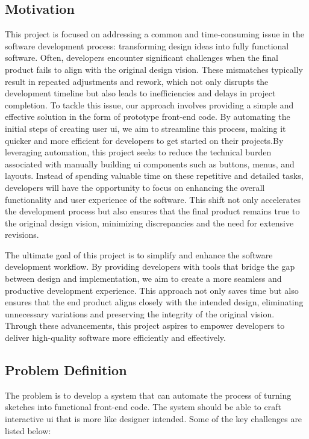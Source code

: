     
    \subsection{Motivation}
    This project is focused on addressing a common and time-consuming issue in the software development process: transforming design ideas into fully functional software. Often, developers encounter significant challenges when the final product fails to align with the original design vision. These mismatches typically result in repeated adjustments and rework, which not only disrupts the development timeline but also leads to inefficiencies and delays in project completion. To tackle this issue, our approach involves providing a simple and effective solution in the form of prototype front-end code. By automating the initial steps of creating user \gls{ui}, we aim to streamline this process, making it quicker and more efficient for developers to get started on their projects.By leveraging automation, this project seeks to reduce the technical burden associated with manually building \gls{ui} components such as buttons, menus, and layouts. Instead of spending valuable time on these repetitive and detailed tasks, developers will have the opportunity to focus on enhancing the overall functionality and user experience of the software. This shift not only accelerates the development process but also ensures that the final product remains true to the original design vision, minimizing discrepancies and the need for extensive revisions.

    The ultimate goal of this project is  to simplify and enhance the software development workflow. By providing developers with tools that bridge the gap between design and implementation, we aim to create a more seamless and productive development experience. This approach not only saves time but also ensures that the end product aligns closely with the intended design, eliminating unnecessary variations and preserving the integrity of the original vision. Through these advancements, this project aspires to empower developers to deliver high-quality software more efficiently and effectively.
    \subsection{Problem Definition}
The problem is to develop a system that can automate the process of turning sketches
into functional front-end code. The system should be able to craft interactive \gls{ui} that is more like designer intended.
Some of the key challenges are listed below:

